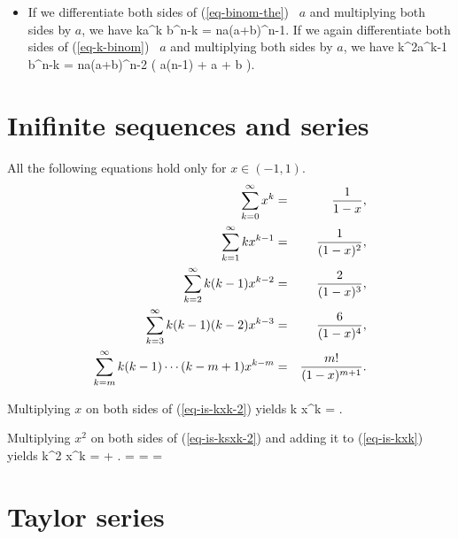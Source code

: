 \begin{itemize}
	\item If we differentiate both sides of (\ref{eq-binom-the}) \wrt\ $a$
	and multiplying both sides by $a$,
	we have
		\sumkton {} ka^{k} b^{n-k}
		= na(a+b)^{n-1}.
	\eeql
	If we again differentiate both sides of (\ref{eq-k-binom}) \wrt\ $a$
	and multiplying both sides by $a$,
	we have
		\sumkzton {} k^2a^{k-1} b^{n-k}
		=
		na(a+b)^{n-2} ( a(n-1) + a + b ).
	\eeql
	\iffalse
	\[
		n(a+b)^{n-1} = \sumkton k \chs{n}{k} a^{k-1} b^{n-k}.
	\]
	\[
		n(n-1)(a+b)^{n-2} = \sumto{k}{2}{n} k(k-1)\chs{n}{k} a^{k-2} b^{n-k}.
	\]
	\[
		\sumto{k}{1}{n} k^2\chs{n}{k} a^{k} b^{n-k}
		 = \sumto{k}{2}{n} k(k-1)\chs{n}{k} a^{k} b^{n-k}
		 + \sumto{k}{1}{n} k\chs{n}{k} a^{k} b^{n-k}
		 \]
		 \[
		 = a^2 n(n-1) (a+b)^{n-2} + na(a+b)^{n-1}
		 = na(a+b)^{n-2} ( a(n-1) + (a+b))
	\]
	\fi


\end{itemize}



\section{Inifinite sequences and series}

All the following equations hold only for $x\in(-1,1)$.
\begin{eqnarray}
\label{eq-is-xk}
	\sum_{k=0}^{\infty} x^k
	&=& \frac{1}{1-x},
\\ \label{eq-is-kxk-2}
	\sum_{k=1}^{\infty} k x^{k-1}
	&=& \frac{1}{(1-x)^2},
\\ \label{eq-is-ksxk-2}
	\sum_{k=2}^{\infty} k (k-1)x^{k-2}
	&=& \frac{2}{(1-x)^3},
\\ \label{eq-is-kcxk-2}
	\sum_{k=3}^{\infty} k (k-1)(k-2)  x^{k-3}
	&=& \frac{6}{(1-x)^4},
\\ \label{eq-is-kmxk-2}
	\sum_{k=m}^{\infty} k (k-1) \cdots (k-m+1)  x^{k-m}
	&=& \frac{m!}{(1-x)^{m+1}}.
\end{eqnarray}

Multiplying $x$ on both sides of (\ref{eq-is-kxk-2}) yields
	\sumktoi k x^k = .
\eeql

Multiplying $x^2$ on both sides of (\ref{eq-is-ksxk-2}) and adding it to (\ref{eq-is-kxk})
yields
	\sumktoi k^2 x^k =  + .
	= 
	= 
	= 
\eeql

\section{Taylor series}

